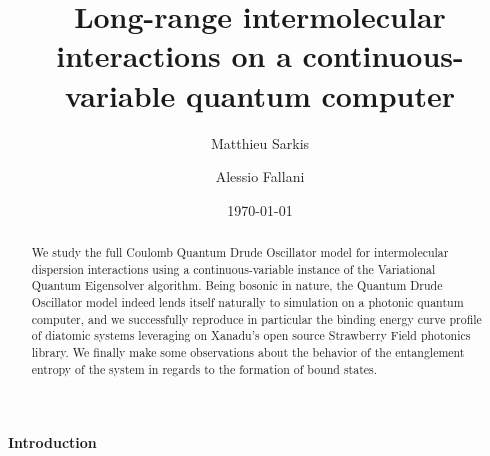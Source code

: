 \documentclass[reprint, amsmath, amssymb, floatfix, aps, pra]{revtex4-2}
\begin{document}
\preprint{}

\title{Long-range intermolecular interactions on a continuous-variable quantum computer}

\author{Matthieu Sarkis}

\author{Alessio Fallani}


\date{\today}

\begin{abstract}
    We study the full Coulomb Quantum Drude Oscillator model for intermolecular dispersion interactions using a continuous-variable instance of the Variational Quantum Eigensolver algorithm. Being bosonic in nature, the Quantum Drude Oscillator model indeed lends itself naturally to simulation on a photonic quantum computer, and we successfully reproduce in particular the binding energy curve profile of diatomic systems leveraging on Xanadu's open source Strawberry Field photonics library. We finally make some observations about the behavior of the entanglement entropy of the system in regards to the formation of bound states.
\end{abstract}


\maketitle


\paragraph*{Introduction}
\end{document}
